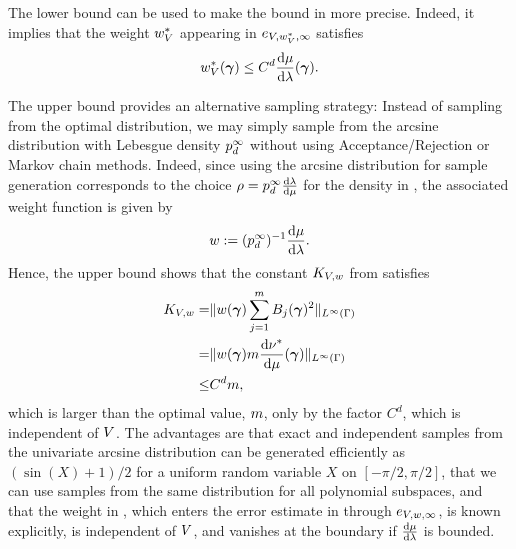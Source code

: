 The lower bound can be used to make the bound in  more precise. Indeed, it implies that the weight $w^{*}_{V}$ appearing in $e_{V,w^{*}_{V},\infty}$ satisfies
\begin{equation}
\label{eq:weightbound}
w^{*}_{V}(\bm{\gamma})\leq C^{d}\frac{\text{d}\mu}{\text{d}\lambda}(\bm{\gamma}).
\end{equation}

 The upper bound provides an alternative sampling strategy:  Instead of sampling from the optimal distribution, we may simply sample from the arcsine distribution with Lebesgue density $p^{\infty}_{d}$ without using Acceptance/Rejection or Markov chain methods. Indeed, since using the arcsine distribution for sample generation corresponds to the choice $\rho=p^{\infty}_{d}\frac{\text{d}\lambda}{\text{d}\mu}$ for the density in , the associated weight function is given by
 \begin{equation}
 \label{eq:arcsineweight}
 w:=(p^{\infty}_{d})^{-1}\frac{\text{d}\mu}{\text{d}\lambda}.
 \end{equation}
 Hence, the upper bound  shows that the constant $K_{V,w}$ from  satisfies
 \begin{equation}
 \label{eq:arcsineK}
 \begin{split} K_{V,w}=&\|w(\bm{\gamma})\sum_{j=1}^{m}B_j(\bm{\gamma})^2\|_{L^\infty(\Gamma)}\\
 =&\|w(\bm{\gamma})m\frac{\text{d}\nu^{*}}{\text{d}\mu}(\bm{\gamma})\|_{L^\infty(\Gamma)}\\
 \leq &C^dm,
 \end{split}
 \end{equation}
 which is larger than the optimal value, $m$, only by the factor $C^d$, which is independent of $V$.
 The advantages are that exact and independent samples from the univariate arcsine distribution can be generated  efficiently as $(\sin(X)+1)/2$ for a uniform random variable $X$ on $[-\pi/2,\pi/2]$, that we can use samples from the same distribution for all polynomial subspaces, and that the weight in , which enters the error estimate in  through $e_{V,w,\infty}$, is known explicitly, is independent of $V$, and vanishes at the boundary if $\frac{\text{d}\mu}{\text{d}\lambda}$ is bounded.
 

